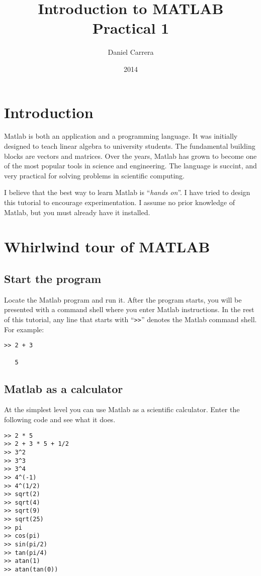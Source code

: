 \documentclass[12pt,a4paper]{article}   %
\author{Daniel Carrera}
\title{Introduction to MATLAB \\ Practical 1}
\date{2014}
\newcommand{\code}[1]{\texttt{#1}}
\begin{document}
\maketitle

\section{Introduction}

Matlab is both an application and a programming language. It was initially designed to
teach linear algebra to university students. The fundamental building blocks are vectors
and matrices. Over the years, Matlab has grown to become one of the most popular tools
in science and engineering. The language is succint, and very practical for solving
problems in scientific computing.

I believe that the best way to learn Matlab is ``\textit{hands on}''. I have tried to
design this tutorial to encourage experimentation. I assume no prior knowledge of
Matlab, but you must already have it installed.


\section{Whirlwind tour of MATLAB}

\subsection{Start the program}

Locate the Matlab program and run it. After the program starts, you will be presented with
a command shell where you enter Matlab instructions. In the rest of this tutorial,
any line that starts with ``\code{>>}'' denotes the Matlab command shell. For example:

\begin{verbatim}
>> 2 + 3

   5
\end{verbatim}


\subsection{Matlab as a calculator}

At the simplest level you can use Matlab as a scientific calculator. Enter the following
code and see what it does.

\begin{verbatim}
>> 2 * 5
>> 2 + 3 * 5 + 1/2
>> 3^2
>> 3^3
>> 3^4
>> 4^(-1)
>> 4^(1/2)
>> sqrt(2)
>> sqrt(4)
>> sqrt(9)
>> sqrt(25)
>> pi
>> cos(pi)
>> sin(pi/2)
>> tan(pi/4)
>> atan(1)
>> atan(tan(0))
\end{verbatim}
\end{document}
